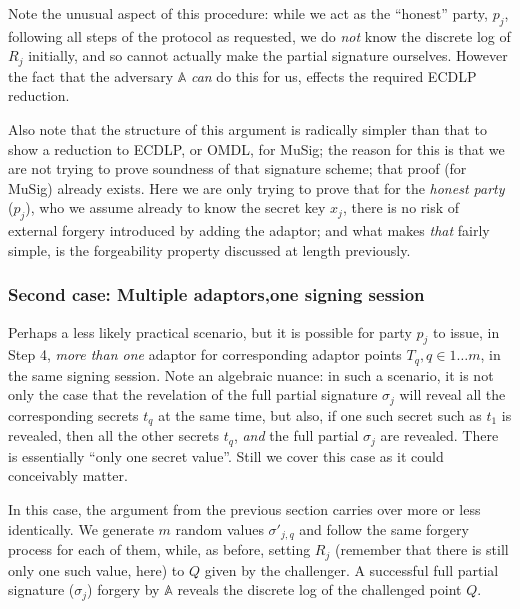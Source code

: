 \documentclass[10pt,a4paper]{article}
\begin{document}
\vspace{5 pt}

Note the unusual aspect of this procedure: while we act as the ``honest'' party, $p_j$, following all steps of the protocol as requested, we do \emph{not} know the discrete log of $R_j$ initially, and so cannot actually make the partial signature ourselves. However the fact that the adversary $\mathbb{A}$ \emph{can} do this for us, effects the required ECDLP reduction.

\vspace{5 pt}

Also note that the structure of this argument is radically simpler than that to show a reduction to ECDLP, or OMDL, for MuSig; the reason for this is that we are not trying to prove soundness of that signature scheme; that proof (for MuSig) already exists. Here we are only trying to prove that for the \emph{honest party} ($p_j$), who we assume already to know the secret key $x_j$, there is no risk of external forgery introduced by adding the adaptor; and what makes \emph{that} fairly simple, is the forgeability property discussed at length previously.

\subsubsection{Second case: Multiple adaptors,one signing session}

Perhaps a less likely practical scenario, but it is possible for party $p_j$ to issue, in Step 4, \emph{more than one} adaptor for corresponding adaptor points $T_q, q \in 1 \ldots m$, in the same signing session. Note an algebraic nuance: in such a scenario, it is not only the case that the revelation of the full partial signature $\sigma_j$ will reveal all the corresponding secrets $t_q$ at the same time, but also, if one such secret such as $t_1$ is revealed, then all the other secrets $t_q$, \emph{and} the full partial $\sigma_j$ are revealed. There is essentially ``only one secret value''. Still we cover this case as it could conceivably matter.

\vspace{5 pt}

In this case, the argument from the previous section carries over more or less identically. We generate $m$ random values $\sigma'_{j,q}$ and follow the same forgery process for each of them, while, as before, setting $R_j$ (remember that there is still only one such value, here) to $Q$ given by the challenger. A successful full partial signature ($\sigma_j$) forgery by $\mathbb{A}$ reveals the discrete log of the challenged point $Q$.
\end{document}
